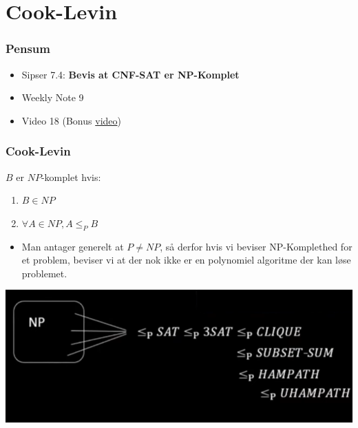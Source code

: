 \section{Cook-Levin}%
\label{sec:cooklevin}

\begin{frame}
	\frametitle{Pensum}
	\begin{itemize}
		\item Sipser 7.4: \textbf{Bevis at CNF-SAT er NP-Komplet}
		\item Weekly Note 9
		\item Video 18 (Bonus \href{https://www.youtube.com/watch?v=6Az1gtDRaAU}{video})
	\end{itemize}
\end{frame}

\begin{frame}[allowframebreaks]
  \frametitle{Cook-Levin}
  \begin{definition}
	$B$ er $NP$-komplet hvis:
	\begin{enumerate}
	  \item $B \in NP$
	  \item $\forall A \in NP, A \le_{P} B$
	\end{enumerate}
  \end{definition}
  \begin{itemize}
	\item Man antager generelt at $P \ne NP$, så derfor hvis vi beviser NP-Komplethed for et problem, beviser vi at der nok ikke er en polynomiel algoritme der kan løse problemet.
  \end{itemize}

  \begin{center}
	\includegraphics[scale=0.4]{figur/video16a.png}
  \end{center}


\end{frame}
